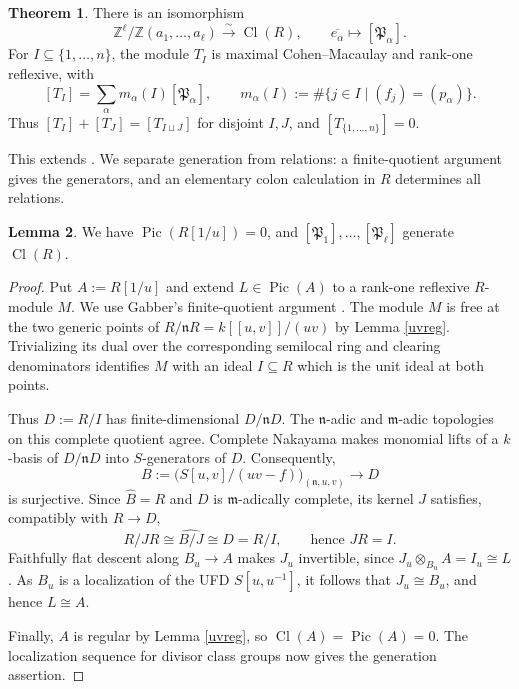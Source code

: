 \documentclass[a4paper,reqno]{amsart}
\def\m{\mathfrak{m}}
\def\n{\mathfrak{n}}
\DeclareMathOperator{\Cl}{Cl}
\DeclareMathOperator{\Pic}{Pic}
\theoremstyle{definition}
\newtheorem{Thm}{Theorem}[section]
\newtheorem{Lem}[Thm]{Lemma}
\begin{document}
\begin{Thm}\label{thm:divisor-class-group}
There is an isomorphism
\begin{equation}\label{eq:divisor-class-group}
\mathbb Z^{\ell}/\mathbb Z(a_1,\ldots,a_{\ell})
\xrightarrow{\ \sim\ }\Cl(R),\qquad \overline{e_\alpha}\longmapsto[\mathfrak P_\alpha].
\end{equation}
For $I\subseteq\{1,\ldots,n\}$, the module $T_I$ is maximal Cohen--Macaulay and rank-one reflexive, with
\begin{equation}\label{eq:factor-ideal-classes}
[T_I]=\sum_\alpha m_\alpha(I)[\mathfrak P_\alpha],\qquad
m_\alpha(I):=\#\{j\in I\mid(f_j)=(p_\alpha)\}.
\end{equation}
Thus $[T_I]+[T_J]=[T_{I\sqcup J}]$ for disjoint $I,J$, and $[T_{\{1,\ldots,n\}}]=0$.
\end{Thm}

This extends \cite[Theorem 5.19]{IW18}. We separate generation from relations: a finite-quotient argument gives the generators, and an elementary colon calculation in $R$ determines all relations.

\begin{Lem}\label{lem:class-group-generation}
We have $\Pic(R[1/u])=0$, and $[\mathfrak P_1],\ldots,[\mathfrak P_{\ell}]$ generate $\Cl(R)$.
\end{Lem}
\begin{proof}
Put $A:=R[1/u]$ and extend $L\in\Pic(A)$ to a rank-one reflexive $R$-module $M$. We use Gabber's finite-quotient argument \cite[proof of Lemma 6.2]{Poi22}. The module $M$ is free at the two generic points of $R/\n R=k[[u,v]]/(uv)$ by Lemma \ref{uvreg}. Trivializing its dual over the corresponding semilocal ring and clearing denominators identifies $M$ with an ideal $I\subseteq R$ which is the unit ideal at both points.

Thus $D:=R/I$ has finite-dimensional $D/\n D$. The $\n$-adic and $\m$-adic topologies on this complete quotient agree. Complete Nakayama makes monomial lifts of a $k$-basis of $D/\n D$ into $S$-generators of $D$. Consequently,
\[
B:=\bigl(S[u,v]/(uv-f)\bigr)_{(\n,u,v)}\longrightarrow D
\]
is surjective. Since $\widehat B=R$ and $D$ is $\m$-adically complete, its kernel $J$ satisfies, compatibly with $R\to D$,
\[
R/JR\cong\widehat{B/J}\cong D=R/I,
\qquad\text{hence }JR=I.
\]
Faithfully flat descent along $B_u\to A$ makes $J_u$ invertible, since $J_u\otimes_{B_u}A=I_u\cong L$. As $B_u$ is a localization of the UFD $S[u,u^{-1}]$, it follows that $J_u\cong B_u$, and hence $L\cong A$.

Finally, $A$ is regular by Lemma \ref{uvreg}, so $\Cl(A)=\Pic(A)=0$. The localization sequence for divisor class groups now gives the generation assertion.
\end{proof}
\end{document}
